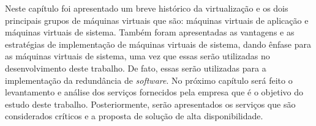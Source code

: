 Neste capítulo foi apresentado um breve histórico da virtualização e os dois principais grupos de máquinas virtuais que são: máquinas virtuais 
de aplicação e máquinas virtuais de sistema. Também foram apresentadas as vantagens e as estratégias de implementação de máquinas virtuais 
de sistema, dando ênfase para as máquinas virtuais de sistema, uma vez que essas serão utilizadas no desenvolvimento deste trabalho. De fato, 
essas serão utilizadas para a implementação da redundância de \textit{software}. No próximo capítulo será feito o levantamento e análise dos 
serviços fornecidos pela empresa que é o objetivo do estudo deste trabalho. Posteriormente, serão apresentados os serviços que são considerados 
críticos e a proposta de solução de alta disponibilidade.
